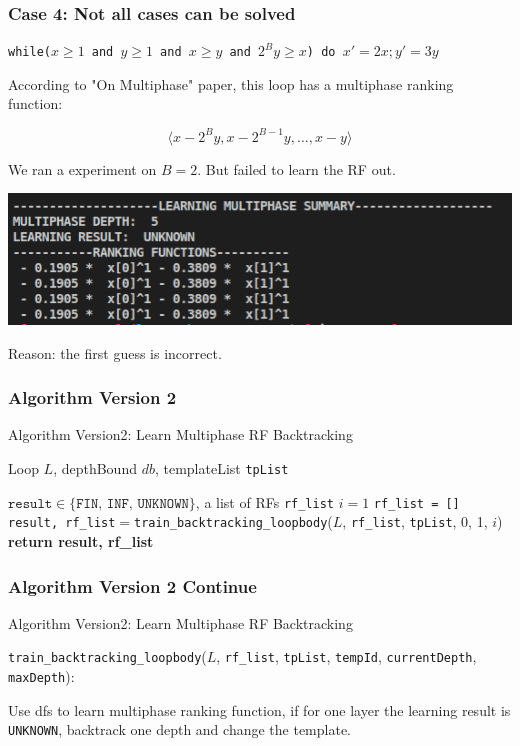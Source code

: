 \documentclass[10pt]{beamer}
\begin{document}
\begin{frame}\frametitle{Case 4: Not all cases can be solved}
\begin{example}
\texttt{while($x \ge 1$ and $y \ge 1 $ and $x \ge y$ and $2^By \ge x$) do }$x' = 2x; y' = 3y$

\end{example}
According to "On Multiphase" paper, this loop has a multiphase ranking function:

\[\langle x - 2^By, x - 2^{B-1}y, \ldots, x - y\rangle\]


We ran a experiment on $B = 2$. But failed to learn the RF out.
\begin{center}
\includegraphics[scale=0.5]{5.png}
\end{center}

Reason: the first guess is incorrect.
\end{frame}



\begin{frame}\frametitle{Algorithm Version 2}

\begin{algorithm}[H]
\caption{Algorithm Version2: Learn Multiphase RF Backtracking }
\begin{algorithmic}[1]
\REQUIRE Loop $L$, depthBound $db$, templateList \texttt{tpList}

\ENSURE $\texttt{result}\in \{\texttt{FIN, INF, UNKNOWN}\}$, a list of RFs \texttt{rf\_list}
\STATE $i = 1$
\STATE \texttt{rf\_list = []}
\STATE \texttt{result, rf\_list}$=$\texttt{train\_backtracking\_loopbody}($L$, \texttt{rf\_list}, \texttt{tpList}, 0, 1, $i$)
	\textbf{return result, rf\_list}
\ENDIF
\ENDWHILE
\end{algorithmic}
\end{algorithm}

\end{frame}

\begin{frame}\frametitle{Algorithm Version 2 Continue}

\begin{algorithm}[H]
\caption{Algorithm Version2: Learn Multiphase RF Backtracking }
\begin{algorithmic}[1]

\texttt{train\_backtracking\_loopbody}($L$, \texttt{rf\_list}, \texttt{tpList}, \texttt{tempId}, \texttt{currentDepth}, \texttt{maxDepth}):

\end{algorithmic}
\end{algorithm}

Use dfs to learn multiphase ranking function, if for one layer the learning result is \texttt{UNKNOWN}, backtrack one depth and change the template.
\end{frame}
\end{document}
